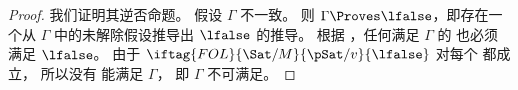 \documentclass[../../../include/open-logic-section]{subfiles}
\begin{document}
\begin{proof}
我们证明其逆否命题。
假设 $\Gamma$ 不一致。
则 $\Gamma \Proves \lfalse$，即存在一个从 $\Gamma$ 中的未解除假设推导出 $\lfalse$ 的推导。
根据 ，任何满足 $\Gamma$ 的
也必须满足 $\lfalse$。
由于 $\iftag{FOL}{\Sat/{M}}{\pSat/{v}}{\lfalse}$ 对每个
 都成立，
所以没有  能满足 $\Gamma$，
即 $\Gamma$ 不可满足。
\end{proof}
\end{document}
